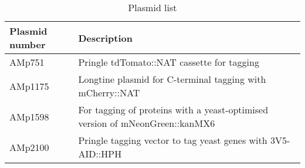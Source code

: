 \begin{table}[htb]
\centering
\renewcommand{\arraystretch}{1.5}
\caption{Plasmid list}
\label{tab:plasmids}
\begin{tabular}{p{}p{}}
\hline
\textbf{Plasmid   number} & \textbf{Description}                                                                    \\
\hline
AMp751           & Pringle tdTomato::NAT cassette for tagging                                    \\
AMp1175          & Longtine plasmid for C-terminal tagging with mCherry::NAT                      \\
AMp1598          & For tagging of proteins with a yeast-optimised version of   mNeonGreen::kanMX6 \\
AMp2100          & Pringle tagging vector to tag   yeast genes with 3V5-AID::HPH 
\\
\hline                                                             

\end{tabular}
\end{table}

